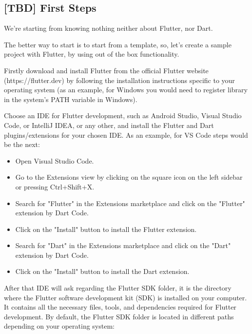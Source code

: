 
\subsection{[TBD] First Steps}

We're starting from knowing nothing neither about Flutter, nor Dart.

The better way to start is to start from a template, so, let's create a sample project with Flutter,
by using out of the box functionality.

Firstly download and install Flutter from the official Flutter website (https://flutter.dev) by following 
the installation instructions specific to your operating system (as an example, for Windows you would need 
to register library in the system's PATH variable in Windows).

Choose an IDE for Flutter development, such as Android Studio, Visual Studio Code, or IntelliJ IDEA, or any other, 
and install the Flutter and Dart plugins/extensions for your chosen IDE. As an example, for VS Code steps would be the
next:
\begin{itemize}
    \item Open Visual Studio Code.
    \item Go to the Extensions view by clicking on the square icon on the left sidebar or pressing Ctrl+Shift+X.
    \item Search for "Flutter" in the Extensions marketplace and click on the "Flutter" extension by Dart Code.
    \item Click on the "Install" button to install the Flutter extension.
    \item Search for "Dart" in the Extensions marketplace and click on the "Dart" extension by Dart Code.
    \item Click on the "Install" button to install the Dart extension.
\end{itemize}

After that IDE will ask regarding the Flutter SDK folder, it is the directory where the Flutter software 
development kit (SDK) is installed on your computer. It contains all the necessary files, tools, and dependencies 
required for Flutter development. By default, the Flutter SDK folder is located in different paths depending on 
your operating system:

